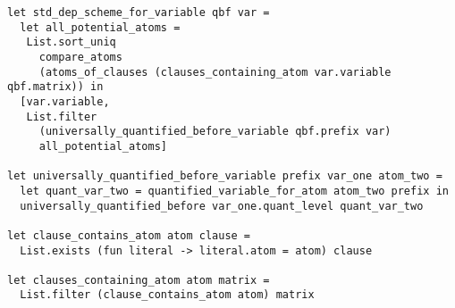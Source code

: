 \begin{lstlisting}[language=caml, label=stddepschemeimpl]
let std_dep_scheme_for_variable qbf var =
  let all_potential_atoms =
   List.sort_uniq
     compare_atoms
     (atoms_of_clauses (clauses_containing_atom var.variable qbf.matrix)) in
  [var.variable,
   List.filter
     (universally_quantified_before_variable qbf.prefix var)
     all_potential_atoms]

let universally_quantified_before_variable prefix var_one atom_two =
  let quant_var_two = quantified_variable_for_atom atom_two prefix in
  universally_quantified_before var_one.quant_level quant_var_two

let clause_contains_atom atom clause =
  List.exists (fun literal -> literal.atom = atom) clause

let clauses_containing_atom atom matrix =
  List.filter (clause_contains_atom atom) matrix
\end{lstlisting}
